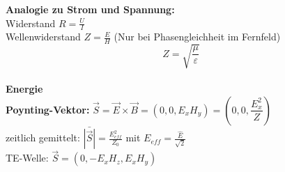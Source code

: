 \documentclass[german]{latex4ei/latex4ei_sheet}
\begin{document}
\begin{sectionbox}
    \textbf{Analogie zu Strom und Spannung:}\\
    Widerstand $R = \frac{U}{I}$\\
    Wellenwiderstand $Z = \frac{E}{H}$ (Nur bei Phasengleichheit im Fernfeld)\\
    $$Z = \sqrt{\frac{\mu}{\varepsilon}}$$\\
    \textbf{Energie}\\
    \textbf{Poynting-Vektor:} $\vec{S} = \vec{E} \times \vec{B} = (0,0,E_xH_y) = \left(0,0, \dfrac{E_x^2}{Z}\right)$\\
    zeitlich gemittelt: $\bar{|\vec{S}|} = \frac{E_{eff}^2}{Z_0}$ \hspace{3mm} mit \hspace{3mm} $E_{eff} = \frac{\hat{E}}{\sqrt{2}}$\\
    TE-Welle: $\vec{S} = (0,-E_xH_z,E_xH_y)$
    
\end{sectionbox}
\end{document}
